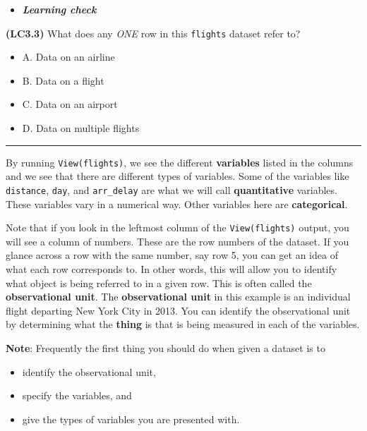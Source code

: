 \documentclass[]{tufte-book}
\let\oldrule=\rule
\renewcommand{\rule}[1]{\oldrule{\linewidth}}
\providecommand{\tightlist}{%
  \setlength{\itemsep}{0pt}\setlength{\parskip}{0pt}}
\newenvironment{rmdblock}[1]
  {\begin{shaded*}
  \begin{itemize}
  \renewcommand{\labelitemi}{
    \raisebox{-.7\height}[0pt][0pt]{
    }
  }
  \item
  }
  {
  \end{itemize}
  \end{shaded*}
  }
\newenvironment{learncheck}
  {\begin{rmdblock}{warning}}
  {\end{rmdblock}}
\theoremstyle{definition}
\theoremstyle{definition}
\theoremstyle{remark}
\begin{document}
\begin{learncheck}
\textbf{\emph{Learning check}}
\end{learncheck}

\textbf{(LC3.3)} What does any \emph{ONE} row in this \texttt{flights}
dataset refer to?

\begin{itemize}
\tightlist
\item
  A. Data on an airline
\item
  B. Data on a flight
\item
  C. Data on an airport
\item
  D. Data on multiple flights
\end{itemize}

\begin{center}\rule{0.5\linewidth}{\linethickness}\end{center}

By running \texttt{View(flights)}, we see the different
\textbf{variables} listed in the columns and we see that there are
different types of variables. Some of the variables like
\texttt{distance}, \texttt{day}, and \texttt{arr\_delay} are what we
will call \textbf{quantitative} variables. These variables vary in a
numerical way. Other variables here are \textbf{categorical}.

Note that if you look in the leftmost column of the
\texttt{View(flights)} output, you will see a column of numbers. These
are the row numbers of the dataset. If you glance across a row with the
same number, say row 5, you can get an idea of what each row corresponds
to. In other words, this will allow you to identify what object is being
referred to in a given row. This is often called the
\textbf{observational unit}. The \textbf{observational unit} in this
example is an individual flight departing New York City in 2013. You can
identify the observational unit by determining what the \textbf{thing}
is that is being measured in each of the variables.

\textbf{Note}: Frequently the first thing you should do when given a
dataset is to

\begin{itemize}
\tightlist
\item
  identify the observational unit,
\item
  specify the variables, and
\item
  give the types of variables you are presented with.
\end{itemize}
\end{document}
